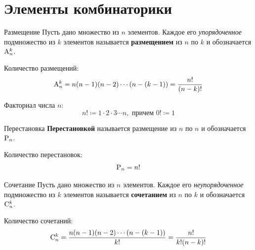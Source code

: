 \section{Элементы комбинаторики}

\begin{definition}{Размещение}{}
    Пусть дано множество из $n$ элементов.
    Каждое его \textit{упорядоченное} подмножество из $k$ элементов
    называется \textbf{размещением} из $n$ по $k$ и обозначается $\mathrm{A}_{n}^{k}$.
\end{definition}

Количество размещений:
\[
    \mathrm{A}_{n}^{k} = n(n-1)(n-2) \cdots (n-(k-1)) = \frac{n!}{(n-k)!}
\]

Факториал числа $n$:
\[
    n! \coloneqq 1 \cdot 2 \cdot 3 \cdots n, \text{ причем } 0! \coloneqq 1
\]

\begin{definition}{Перестановка}{}
    \textbf{Перестановкой} называется размещение из $n$ по $n$ и обозначается $\mathrm{P}_{n}$.
\end{definition}

Количество перестановок:
\[
    \mathrm{P}_{n} = n!
\]

\begin{definition}{Сочетание}{}
    Пусть дано множество из $n$ элементов.
    Каждое его \textit{неупорядоченное} подмножество из $k$ элементов
    называется \textbf{сочетанием} из $n$ по $k$ и обозначается $\mathrm{C}_{n}^{k}$.
\end{definition}

Количество сочетаний:
\[
    \mathrm{C}_{n}^{k} = \frac{n(n-1)(n-2) \cdots (n-(k-1))}{k!} = \frac{n!}{k!(n-k)!}
\]
